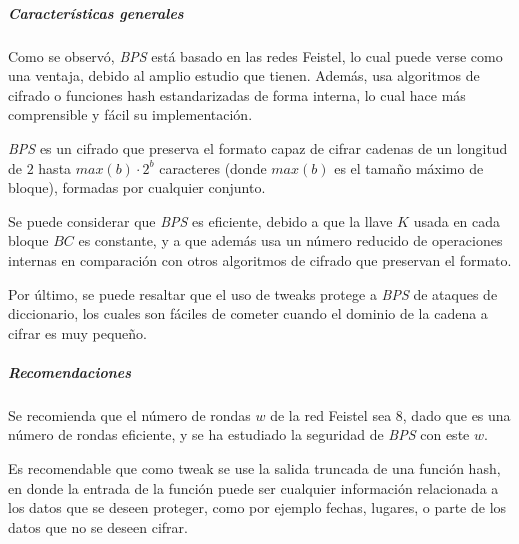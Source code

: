 
\subparagraph{Características generales}

Como se observó, \textit{BPS} está basado en las redes Feistel, lo cual puede 
verse como una ventaja, debido al amplio estudio que tienen. Además, usa 
algoritmos de cifrado o funciones hash estandarizadas de forma interna, lo 
cual hace más comprensible y fácil su implementación.

\textit{BPS} es un cifrado que preserva el formato capaz de cifrar cadenas de 
un longitud de $2$ hasta $max(b) \cdot 2^{b}$ caracteres (donde $max(b)$ es el 
tamaño máximo de bloque), formadas por cualquier conjunto.

Se puede considerar que \textit{BPS} es eficiente, debido a que la llave $K$ 
usada en cada bloque $BC$ es constante, y a que además usa un número reducido 
de operaciones internas en comparación con otros algoritmos de cifrado que 
preservan el formato.

Por último, se puede resaltar que el uso de tweaks protege a \textit{BPS} de 
ataques de diccionario, los cuales son fáciles de cometer cuando el dominio 
de la cadena a cifrar es muy pequeño.


\subparagraph{Recomendaciones}

Se recomienda que el número de rondas $w$ de la red Feistel sea $8$, dado 
que es una número de rondas eficiente, y se ha estudiado la seguridad de 
\textit{BPS} con este $w$.

Es recomendable que como tweak se use la salida truncada de una función hash,
en donde la entrada de la función puede ser cualquier información relacionada 
a los datos que se deseen proteger, como por ejemplo fechas, lugares, o parte 
de los datos que no se deseen cifrar.



